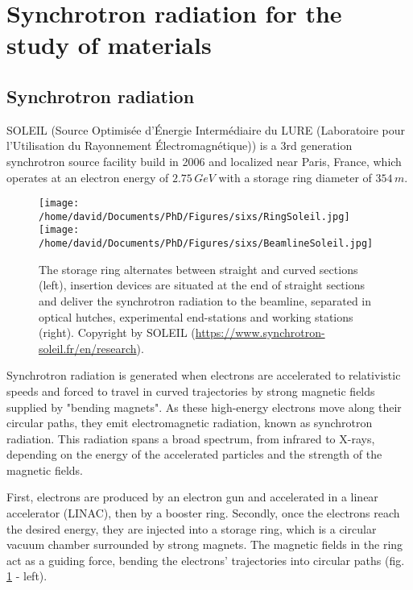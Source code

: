 \section{Synchrotron radiation for the study of materials} \label{sec:SIXS}

\subsection{Synchrotron radiation}

SOLEIL (Source Optimisée d’Énergie Intermédiaire du LURE (Laboratoire pour l’Utilisation du Rayonnement Électromagnétique)) is a 3rd generation synchrotron source facility build in 2006 and localized near Paris, France, which operates at an electron energy of $2.75 \, GeV$ with a storage ring diameter of $354 \, m$.

\begin{figure}[!htb]
    \centering
    \texttt{[image: /home/david/Documents/PhD/Figures/sixs/RingSoleil.jpg]}
    \texttt{[image: /home/david/Documents/PhD/Figures/sixs/BeamlineSoleil.jpg]}
    \caption{
    	The storage ring alternates between straight and curved sections (left), insertion devices are situated at the end of straight sections and deliver the synchrotron radiation to the beamline, separated in optical hutches, experimental end-stations and working stations (right).
    	Copyright by SOLEIL (\url{https://www.synchrotron-soleil.fr/en/research}).
    }
    \label{fig:SOLEIL}
\end{figure}

Synchrotron radiation is generated when electrons are accelerated to relativistic speeds and forced to travel in curved trajectories by strong magnetic fields supplied by "bending magnets".
As these high-energy electrons move along their circular paths, they emit electromagnetic radiation, known as synchrotron radiation.
This radiation spans a broad spectrum, from infrared to X-rays, depending on the energy of the accelerated particles and the strength of the magnetic fields.

First, electrons are produced by an electron gun and accelerated in a linear accelerator (LINAC), then by a booster ring.
Secondly, once the electrons reach the desired energy, they are injected into a storage ring, which is a circular vacuum chamber surrounded by strong magnets.
The magnetic fields in the ring act as a guiding force, bending the electrons' trajectories into circular paths (fig. \ref{fig:SOLEIL} - left).

